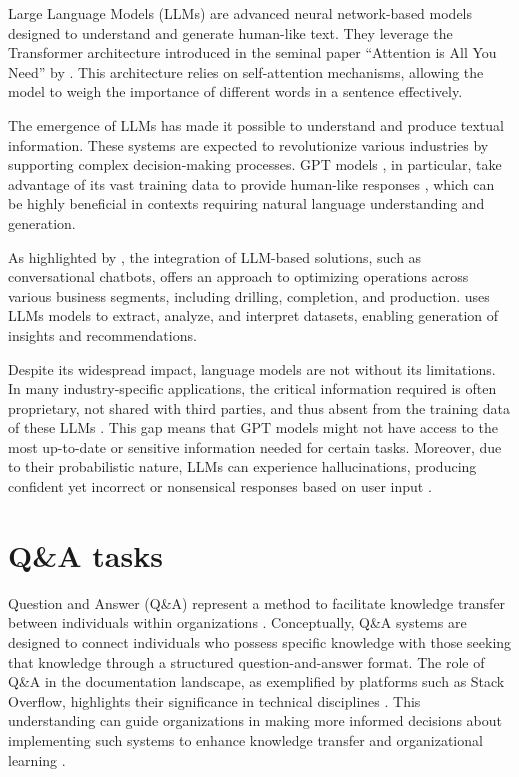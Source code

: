         Large Language Models (LLMs) are advanced neural network-based models designed to understand and generate human-like text. 
        They leverage the Transformer architecture introduced in the seminal paper \enquote{Attention is All You Need} by \citet{Vaswani2017}. 
        This architecture relies on self-attention mechanisms, allowing the model to weigh the importance of different words in a sentence effectively. 

        The emergence of LLMs has made it possible to understand and produce textual information. 
        These systems are expected to revolutionize various industries by supporting complex decision-making processes. GPT models \citep{OpenAI2023}, in particular, take advantage of its vast training data to provide human-like responses \citep{Mosser2024}, which can be highly beneficial in contexts requiring natural language understanding and generation. 
        
        As highlighted by \citet{Singh2023}, the integration of LLM-based solutions, such as conversational chatbots, offers an approach to optimizing operations across various business segments, including drilling, completion, and production.
        \citet{Singh2023} uses LLMs models to extract, analyze, and interpret datasets, enabling generation of insights and recommendations. 

        Despite its widespread impact, language models are not without its limitations. 
        In many industry-specific applications, the critical information required is often proprietary, not shared with third parties, and thus absent from the training data of these LLMs \citep{Mosser2024}. 
        This gap means that GPT models might not have access to the most up-to-date or sensitive information needed for certain tasks. 
        Moreover, due to their probabilistic nature, LLMs can experience hallucinations, producing confident yet incorrect or nonsensical responses based on user input \citep{OpenAI2023}. 

    \section{Q\&A tasks}     

        Question and Answer (Q\&A) represent a method to facilitate knowledge transfer between individuals within organizations \citep{Iske2005}. 
        Conceptually, Q\&A systems are designed to connect individuals who possess specific knowledge with those seeking that knowledge through a structured question-and-answer format. 
        The role of Q\&A in the documentation landscape, as exemplified by platforms such as Stack Overflow, highlights their significance in technical disciplines \citep{Treude2011}. 
        This understanding can guide organizations in making more informed decisions about implementing such systems to enhance knowledge transfer and organizational learning \citep{Iske2005}.

